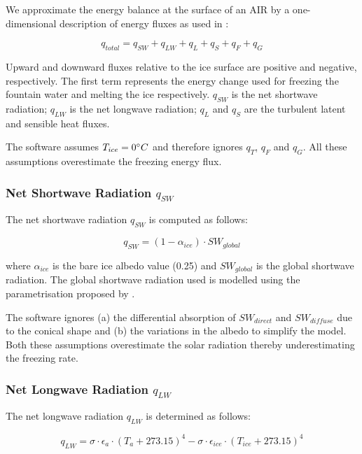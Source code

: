 \documentclass[utf8]{frontiersSCNS}
\begin{document}
We approximate the energy balance at the surface of an AIR by a one-dimensional description of energy fluxes as
used in \cite{Balasubramanian_2022}:

\begin{equation}
	 q_{total} = q_{SW} + q_{LW} + q_{L} + q_{S} + q_{F} + q_{G}
	\label{eqn:EB}
\end{equation}

Upward and downward fluxes relative to the ice surface are positive and negative, respectively. The first
term represents the energy change used for freezing the fountain water and melting the ice respectively.
$q_{SW}$ is the net shortwave radiation; $q_{LW}$ is the net longwave radiation; $q_{L}$ and $q_{S}$ are the
turbulent latent and sensible heat fluxes. 

The software assumes $T_{ice} = 0 \degree C$ and therefore ignores $q_{T}$, $q_{F}$ and $q_{G}$. All these
assumptions overestimate the freezing energy flux.

\subsubsection{Net Shortwave Radiation \texorpdfstring{$q_{SW}$}{Lg}} \label{sec:SW}

The net shortwave radiation $q_{SW}$ is computed as follows:

\begin{equation} q_{SW} = (1- \alpha_{ice})\cdot SW_{global} \label{eqn:SW} \end{equation}

where $\alpha_{ice}$ is the bare ice albedo value (0.25) and $SW_{global}$ is the global shortwave radiation.
The global shortwave radiation used is modelled using the parametrisation proposed by \cite{Woolf_1968}.

The software ignores (a) the differential absorption of $SW_{direct}$ and $SW_{diffuse}$ due to the conical
shape and (b) the variations in the albedo to simplify the model. Both these assumptions overestimate the solar
radiation thereby underestimating the freezing rate.

\subsubsection{Net Longwave Radiation \texorpdfstring{$q_{LW}$}{Lg}} \label{sec:LW}

The net longwave radiation $q_{LW}$ is determined as follows:

\begin{equation}
	q_{LW}= \sigma \cdot \epsilon_a \cdot {(T_a+ 273.15)}^4 -\sigma \cdot \epsilon_{ice} \cdot {(T_{ice}+ 273.15)}^4
	\label{eqn:LW}
\end{equation}
\end{document}
